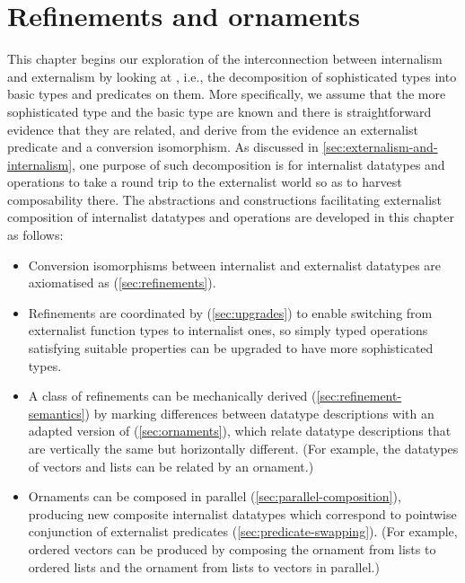 \chapter{Refinements and ornaments}
\label{chap:refinements-and-ornaments}

This chapter begins our exploration of the interconnection between internalism and externalism by looking at , i.e., the decomposition of sophisticated types into basic types and predicates on them.
More specifically, we assume that the more sophisticated type and the basic type are known and there is straightforward evidence that they are related, and derive from the evidence an externalist predicate and a conversion isomorphism.
As discussed in \autoref{sec:externalism-and-internalism}, one purpose of such decomposition is for internalist datatypes and operations to take a round trip to the externalist world so as to harvest composability there.
The abstractions and constructions facilitating externalist composition of internalist datatypes and operations are developed in this chapter as follows:
\begin{itemize}
\item Conversion isomorphisms between internalist and externalist datatypes are axiomatised as  (\autoref{sec:refinements}).
\item Refinements are coordinated by  (\autoref{sec:upgrades}) to enable switching from externalist function types to internalist ones, so simply typed operations satisfying suitable properties can be upgraded to have more sophisticated types.
\item A class of refinements can be mechanically derived (\autoref{sec:refinement-semantics}) by marking differences between datatype descriptions with an adapted version of  (\autoref{sec:ornaments}), which relate datatype descriptions that are vertically the same but horizontally different. (For example, the datatypes of vectors and lists can be related by an ornament.)
\item Ornaments can be composed in parallel (\autoref{sec:parallel-composition}), producing new composite internalist datatypes which correspond to pointwise conjunction of externalist predicates (\autoref{sec:predicate-swapping}). (For example, ordered vectors can be produced by composing the ornament from lists to ordered lists and the ornament from lists to vectors in parallel.)
\end{itemize}


